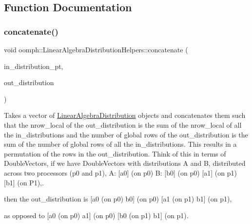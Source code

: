 \subsection{Function Documentation}
\mbox{\label{namespaceoomph_1_1LinearAlgebraDistributionHelpers_ad3ba423fba64e7db91e9155efa7df5d0}} 
\subsubsection{\texorpdfstring{concatenate()}{concatenate()}}
{\footnotesize\ttfamily void oomph\+::\+Linear\+Algebra\+Distribution\+Helpers\+::concatenate (\begin{DoxyParamCaption}\item[{const \hyperlink{classoomph_1_1Vector}{Vector}$<$ \hyperlink{classoomph_1_1LinearAlgebraDistribution}{Linear\+Algebra\+Distribution} $\ast$$>$ \&}]{in\+\_\+distribution\+\_\+pt,  }\item[{\hyperlink{classoomph_1_1LinearAlgebraDistribution}{Linear\+Algebra\+Distribution} \&}]{out\+\_\+distribution }\end{DoxyParamCaption})}



Takes a vector of \hyperlink{classoomph_1_1LinearAlgebraDistribution}{Linear\+Algebra\+Distribution} objects and concatenates them such that the nrow\+\_\+local of the out\+\_\+distribution is the sum of the nrow\+\_\+local of all the in\+\_\+distributions and the number of global rows of the out\+\_\+distribution is the sum of the number of global rows of all the in\+\_\+distributions. This results in a permutation of the rows in the out\+\_\+distribution. Think of this in terms of Double\+Vectors, if we have Double\+Vectors with distributions A and B, distributed across two processors (p0 and p1), A\+: \mbox{[}a0\mbox{]} (on p0) B\+: \mbox{[}b0\mbox{]} (on p0) \mbox{[}a1\mbox{]} (on p1) \mbox{[}b1\mbox{]} (on P1),. 

then the out\+\_\+distribution is \mbox{[}a0 (on p0) b0\mbox{]} (on p0) \mbox{[}a1 (on p1) b1\mbox{]} (on p1),

as opposed to \mbox{[}a0 (on p0) a1\mbox{]} (on p0) \mbox{[}b0 (on p1) b1\mbox{]} (on p1).

